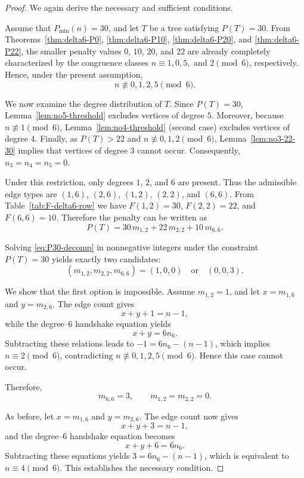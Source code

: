 \documentclass[preprint,12pt]{elsarticle}
\begin{document}
\begin{proof}
We again derive the necessary and sufficient conditions.

\medskip
Assume that $P_{\min}(n)=30$, and let $T$ be a tree satisfying $P(T)=30$.
From Theorems~\ref{thm:delta6-P0}, \ref{thm:delta6-P10},
\ref{thm:delta6-P20}, and \ref{thm:delta6-P22}, the smaller penalty values
$0$, $10$, $20$, and $22$ are already completely characterized by the
congruence classes
$n\equiv 1,0,5,$ and $2\pmod 6$, respectively.
Hence, under the present assumption,
\[
n\not\equiv 0,1,2,5 \pmod 6.
\]

We now examine the degree distribution of $T$.
Since $P(T)=30$, Lemma~\ref{lem:no5-threshold} excludes vertices of degree $5$.
Moreover, because $n\not\equiv 1\pmod 6$, Lemma~\ref{lem:no4-threshold}
(second case) excludes vertices of degree $4$.
Finally, as $P(T)>22$ and $n\not\equiv 0,1,2\pmod 6$, Lemma~\ref{lem:no3-22-30}
implies that vertices of degree $3$ cannot occur.
Consequently, $n_3=n_4=n_5=0$.


Under this restriction, only degrees $1$, $2$, and $6$ are present.
Thus the admissible edge types are
$(1,6)$, $(2,6)$, $(1,2)$, $(2,2)$, and $(6,6)$.
From Table~\ref{tab:F-delta6-row} we have
$F(1,2)=30$, $F(2,2)=22$, and $F(6,6)=10$.
Therefore the penalty can be written as
\begin{equation}
P(T)=30\,m_{1,2}+22\,m_{2,2}+10\,m_{6,6}.
\label{eq:P30-decomp}
\end{equation}

Solving \eqref{eq:P30-decomp} in nonnegative integers under the constraint
$P(T)=30$ yields exactly two candidates:
\[
(m_{1,2},m_{2,2},m_{6,6})=(1,0,0)
\quad\text{or}\quad
(0,0,3).
\]

We show that the first option is impossible.
Assume $m_{1,2}=1$, and let $x=m_{1,6}$ and $y=m_{2,6}$.
The edge count gives
\[
x+y+1=n-1,
\]
while the degree--$6$ handshake equation yields
\[
x+y=6n_6.
\]
Subtracting these relations leads to $-1=6n_6-(n-1)$,
which implies $n\equiv 2\pmod 6$, contradicting
$n\not\equiv 0,1,2,5\pmod 6$.
Hence this case cannot occur.

Therefore,
\begin{equation}
m_{6,6}=3,
\qquad
m_{1,2}=m_{2,2}=0.
\label{eq:m66=3}
\end{equation}

As before, let $x = m_{1,6}$ and $y = m_{2,6}$.
The edge count now gives
\[
x+y+3=n-1,
\]
and the degree--$6$ handshake equation becomes 
\[
x+y+6=6n_6.
\]
Subtracting these equations yields $3=6n_6-(n-1)$,
which is equivalent to
$n\equiv 4 \pmod 6$.
This establishes the necessary condition.


\end{proof}
\end{document}
